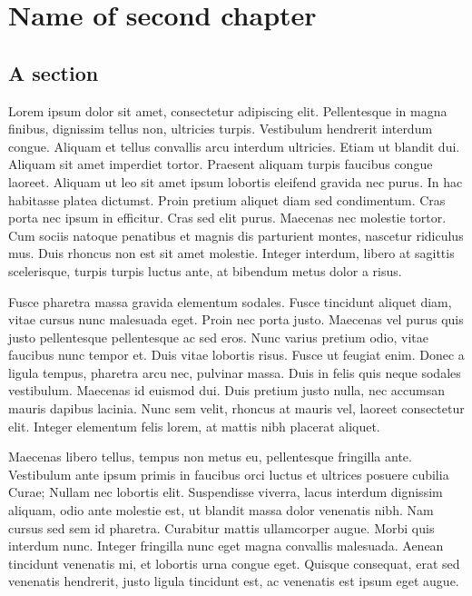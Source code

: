 \chapter{Name of second chapter}

\section{A section}

Lorem ipsum dolor sit amet, consectetur adipiscing elit. Pellentesque in magna finibus, dignissim tellus non, ultricies turpis. Vestibulum hendrerit interdum congue. Aliquam et tellus convallis arcu interdum ultricies. Etiam ut blandit dui. Aliquam sit amet imperdiet tortor. Praesent aliquam turpis faucibus congue laoreet. Aliquam ut leo sit amet ipsum lobortis eleifend gravida nec purus. In hac habitasse platea dictumst. Proin pretium aliquet diam sed condimentum. Cras porta nec ipsum in efficitur. Cras sed elit purus. Maecenas nec molestie tortor. Cum sociis natoque penatibus et magnis dis parturient montes, nascetur ridiculus mus. Duis rhoncus non est sit amet molestie. Integer interdum, libero at sagittis scelerisque, turpis turpis luctus ante, at bibendum metus dolor a risus.

Fusce pharetra massa gravida elementum sodales. Fusce tincidunt aliquet diam, vitae cursus nunc malesuada eget. Proin nec porta justo. Maecenas vel purus quis justo pellentesque pellentesque ac sed eros. Nunc varius pretium odio, vitae faucibus nunc tempor et. Duis vitae lobortis risus. Fusce ut feugiat enim. Donec a ligula tempus, pharetra arcu nec, pulvinar massa. Duis in felis quis neque sodales vestibulum. Maecenas id euismod dui. Duis pretium justo nulla, nec accumsan mauris dapibus lacinia. Nunc sem velit, rhoncus at mauris vel, laoreet consectetur elit. Integer elementum felis lorem, at mattis nibh placerat aliquet.

Maecenas libero tellus, tempus non metus eu, pellentesque fringilla ante. Vestibulum ante ipsum primis in faucibus orci luctus et ultrices posuere cubilia Curae; Nullam nec lobortis elit. Suspendisse viverra, lacus interdum dignissim aliquam, odio ante molestie est, ut blandit massa dolor venenatis nibh. Nam cursus sed sem id pharetra. Curabitur mattis ullamcorper augue. Morbi quis interdum nunc. Integer fringilla nunc eget magna convallis malesuada. Aenean tincidunt venenatis mi, et lobortis urna congue eget. Quisque consequat, erat sed venenatis hendrerit, justo ligula tincidunt est, ac venenatis est ipsum eget augue.

